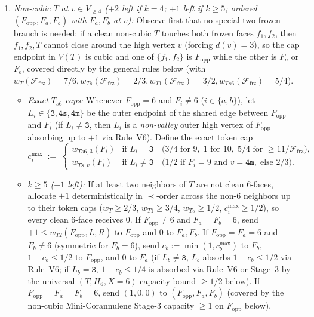 \documentclass[11pt,reqno]{amsart}
\theoremstyle{plain}
\theoremstyle{definition}
\theoremstyle{remark}
\newcommand{\Ffrz}{\mathcal{F}_{\mathrm{frz}}}
\newcommand{\Vge}{V_{\ge 4}}
\DeclareRobustCommand{\_}{\ifmmode\text{\textunderscore}\else\textunderscore\allowbreak\fi}
\begin{document}
\begin{itemize}[leftmargin=1.8em]
\begin{enumerate}[label=(\roman*),leftmargin=2.0em]
    \item \emph{Non-cubic $T$ at $v \in \Vge$ ($+2$ left if $k = 4$; $+1$ left if $k \ge 5$; ordered $(F_{\mathrm{opp}}, F_a, F_b)$ with $F_a, F_b$ at $v$):} Observe first that no special two-frozen branch is needed: if a clean non-cubic $T$ touches both frozen faces $f_1, f_2$, then $f_1, f_2, T$ cannot close around the high vertex $v$ (forcing $d(v) = 3$), so the cap endpoint in $V(T)$ is cubic and one of $\{f_1, f_2\}$ is $F_{\mathrm{opp}}$ while the other is $F_a$ or $F_b$, covered directly by the general rules below (with $w_T(\Ffrz) = 7/6, w_{Ts}(\Ffrz) = 2/3, w_{T1}(\Ffrz) = 3/2, w_{Ts6}(\Ffrz) = 5/4$).
      \begin{itemize}[leftmargin=1.4em]
        \item \emph{Exact $T_{s6}$ caps:} Whenever $F_{\mathrm{opp}} = 6$ and $F_i \neq 6$ ($i \in \{a, b\}$), let $L_i \in \{\texttt{3}, \texttt{4s}, \texttt{4m}\}$ be the outer endpoint of the shared edge between $F_{\mathrm{opp}}$ and $F_i$ (if $L_i \neq \texttt{3}$, then $L_i$ is a \emph{non-valley} outer high vertex of $F_{\mathrm{opp}}$ absorbing up to $+1$ via Rule~V6). Define the exact token cap
        \[
          c_i^{\max} \;:=\; \begin{cases}
            w_{Ts6,3}(F_i) & \text{if } L_i = \texttt{3}\quad\bigl(3/4\text{ for }9,\; 1\text{ for }10,\; 5/4\text{ for }\ge 11/\Ffrz\bigr),\\[2pt]
            w_{Ts,v}(F_i) & \text{if } L_i \neq \texttt{3}\quad\bigl(1/2\text{ if }F_i = 9\text{ and }v = \texttt{4m},\;\text{else }2/3\bigr).
          \end{cases}
        \]
        \item \emph{$k \ge 5$ ($+1$ left):} If at least two neighbors of $T$ are not clean $6$-faces, allocate $+1$ deterministically in $\prec$-order across the non-$6$ neighbors up to their token caps ($w_T \ge 2/3$, $w_{T1} \ge 3/4$, $w_{Ts} \ge 1/2$, $c_i^{\max} \ge 1/2$), so every clean $6$-face receives $0$. If $F_{\mathrm{opp}} \neq 6$ and $F_a = F_b = 6$, send $+1 \le w_{T2}(F_{\mathrm{opp}}, L, R)$ to $F_{\mathrm{opp}}$ and $0$ to $F_a, F_b$. If $F_{\mathrm{opp}} = F_a = 6$ and $F_b \neq 6$ (symmetric for $F_b = 6$), send $c_b := \min(1, c_b^{\max})$ to $F_b$, $1 - c_b \le 1/2$ to $F_{\mathrm{opp}}$, and $0$ to $F_a$ (if $L_b \neq \texttt{3}$, $L_b$ absorbs $1 - c_b \le 1/2$ via Rule~V6; if $L_b = \texttt{3}$, $1 - c_b \le 1/4$ is absorbed via Rule~V6 or Stage~3 by the universal $(T, H_6, X=6)$ capacity bound $\ge 1/2$ below). If $F_{\mathrm{opp}} = F_a = F_b = 6$, send $(1, 0, 0)$ to $(F_{\mathrm{opp}}, F_a, F_b)$ (covered by the non-cubic Mini-Corannulene Stage-3 capacity $\ge 1$ on $F_{\mathrm{opp}}$ below).

\end{itemize}
\end{enumerate}
\end{itemize}
\end{document}
